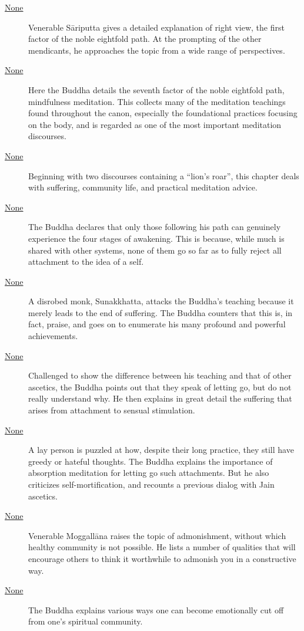 \documentclass[12pt,openany]{book}%
\begin{document}
\begin{description}
\item[\href{\#mn9}{None}] Venerable \textsanskrit{Sāriputta} gives a detailed explanation of right view, the first factor of the noble eightfold path. At the prompting of the other mendicants, he approaches the topic from a wide range of perspectives.%
\item[\href{\#mn10}{None}] Here the Buddha details the seventh factor of the noble eightfold path, mindfulness meditation. This collects many of the meditation teachings found throughout the canon, especially the foundational practices focusing on the body, and is regarded as one of the most important meditation discourses.%
\item[\href{\#mn{-}sihanadavagga}{None}] Beginning with two discourses containing a “lion’s roar”, this chapter deals with suffering, community life, and practical meditation advice.%
\item[\href{\#mn11}{None}] The Buddha declares that only those following his path can genuinely experience the four stages of awakening. This is because, while much is shared with other systems, none of them go so far as to fully reject all attachment to the idea of a self.%
\item[\href{\#mn12}{None}] A disrobed monk, Sunakkhatta, attacks the Buddha’s teaching because it merely leads to the end of suffering. The Buddha counters that this is, in fact, praise, and goes on to enumerate his many profound and powerful achievements.%
\item[\href{\#mn13}{None}] Challenged to show the difference between his teaching and that of other ascetics, the Buddha points out that they speak of letting go, but do not really understand why. He then explains in great detail the suffering that arises from attachment to sensual stimulation.%
\item[\href{\#mn14}{None}] A lay person is puzzled at how, despite their long practice, they still have greedy or hateful thoughts. The Buddha explains the importance of absorption meditation for letting go such attachments. But he also criticizes self-mortification, and recounts a previous dialog with Jain ascetics.%
\item[\href{\#mn15}{None}] Venerable \textsanskrit{Moggallāna} raises the topic of admonishment, without which healthy community is not possible. He lists a number of qualities that will encourage others to think it worthwhile to admonish you in a constructive way.%
\item[\href{\#mn16}{None}] The Buddha explains various ways one can become emotionally cut off from one’s spiritual community.%

\end{description}
\end{document}
